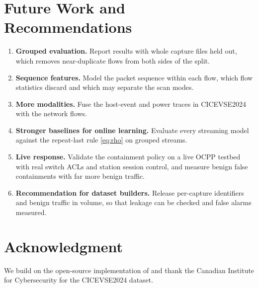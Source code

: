 \documentclass[conference]{IEEEtran}
\begin{document}
\section{Future Work and Recommendations}

\begin{enumerate}
    \item \textbf{Grouped evaluation.} Report results with whole capture files held out, which removes near-duplicate flows from both sides of the split.
    \item \textbf{Sequence features.} Model the packet sequence within each flow, which flow statistics discard and which may separate the scan modes.
    \item \textbf{More modalities.} Fuse the host-event and power traces in CICEVSE2024 with the network flows.
    \item \textbf{Stronger baselines for online learning.} Evaluate every streaming model against the repeat-last rule \eqref{eq:rho} on grouped streams.
    \item \textbf{Live response.} Validate the containment policy on a live OCPP testbed with real switch ACLs and station session control, and measure benign false containments with far more benign traffic.
    \item \textbf{Recommendation for dataset builders.} Release per-capture identifiers and benign traffic in volume, so that leakage can be checked and false alarms measured.
\end{enumerate}

\section*{Acknowledgment}

We build on the open-source implementation of \cite{b4} and thank the Canadian Institute for Cybersecurity for the CICEVSE2024 dataset.
\end{document}

